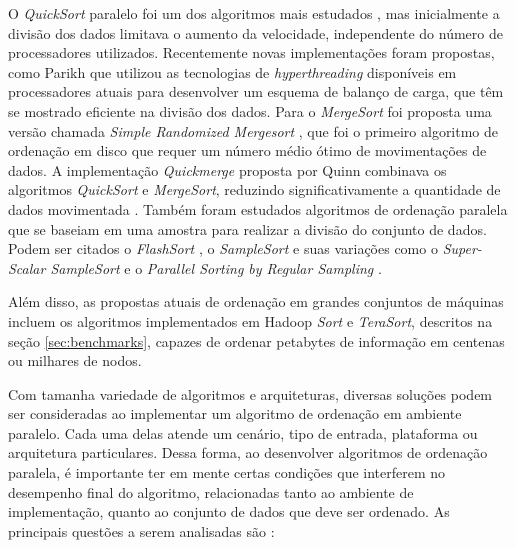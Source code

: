 O \textit{QuickSort} paralelo foi um dos algoritmos mais estudados \cite{Deminet:1982, Quinn:1994, Sanders:1997}, mas inicialmente a divisão dos dados limitava o aumento da velocidade, independente do número de processadores utilizados. Recentemente novas implementações foram propostas, como Parikh \cite{Parikh:2008} que utilizou as tecnologias  de \textit{hyperthreading} disponíveis em processadores atuais para desenvolver um esquema de balanço de carga, que têm se mostrado eficiente na divisão dos dados.
Para o \textit{MergeSort} foi proposta uma versão chamada \textit{Simple Randomized Mergesort} \cite{Barve:1996, Barve:2002}, que foi o primeiro algoritmo de ordenação em disco que requer um número médio ótimo de movimentações de dados. 
 A implementação \textit{Quickmerge} proposta por Quinn combinava os algoritmos \textit{QuickSort} e \textit{MergeSort}, reduzindo significativamente a quantidade de dados movimentada \cite{Quinn:1988}. Também foram estudados algoritmos de ordenação paralela que se baseiam em uma amostra para realizar a divisão do conjunto de dados. Podem ser citados o \textit{FlashSort} \cite{Reif:1987}, o \textit{SampleSort} \cite{Huang:1983} e suas variações como o \textit{Super-Scalar SampleSort }\cite{Sanders:2004} e o \textit{Parallel Sorting by Regular Sampling} \cite{Shi:1992}.

Além disso, as propostas atuais de ordenação em grandes conjuntos de máquinas incluem os algoritmos implementados em Hadoop \textit{Sort} e \textit{TeraSort}, descritos na seção \ref{sec:benchmarks}, capazes de ordenar petabytes de informação em centenas ou milhares de nodos. 



Com tamanha variedade de algoritmos e arquiteturas, diversas soluções podem ser consideradas ao implementar um algoritmo de ordenação em ambiente paralelo. Cada uma delas atende um cenário, tipo de entrada, plataforma ou arquitetura particulares. Dessa forma, ao desenvolver algoritmos de ordenação paralela, é importante ter em mente certas condições que interferem no desempenho final do algoritmo, relacionadas tanto ao ambiente de implementação, quanto ao conjunto de dados que deve ser ordenado. As principais questões a serem analisadas são \cite{Kale:2010}:

